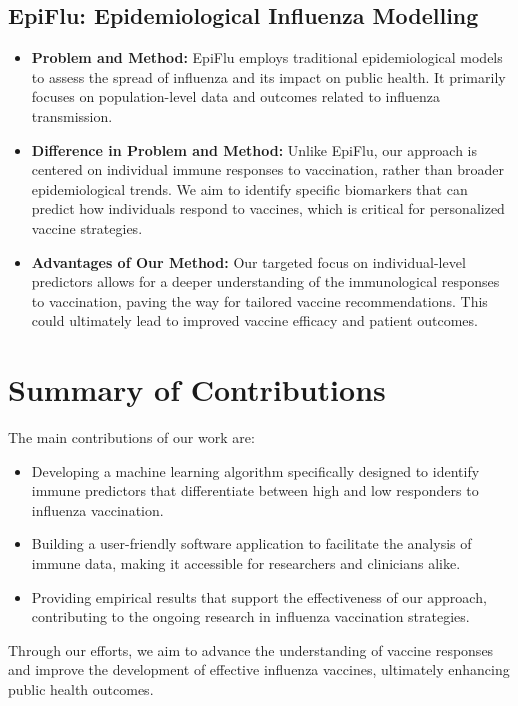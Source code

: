 \documentclass[runningheads,a4paper,11pt]{report}
\begin{document}
\subsection{EpiFlu: Epidemiological Influenza Modelling}
\begin{itemize}
    \item \textbf{Problem and Method:} EpiFlu employs traditional epidemiological models to assess the spread of influenza and its impact on public health. It primarily focuses on population-level data and outcomes related to influenza transmission.
    \item \textbf{Difference in Problem and Method:} Unlike EpiFlu, our approach is centered on individual immune responses to vaccination, rather than broader epidemiological trends. We aim to identify specific biomarkers that can predict how individuals respond to vaccines, which is critical for personalized vaccine strategies.
    \item \textbf{Advantages of Our Method:} Our targeted focus on individual-level predictors allows for a deeper understanding of the immunological responses to vaccination, paving the way for tailored vaccine recommendations. This could ultimately lead to improved vaccine efficacy and patient outcomes.
\end{itemize}

\section{Summary of Contributions}

The main contributions of our work are:
\begin{itemize}
    \item Developing a machine learning algorithm specifically designed to identify immune predictors that differentiate between high and low responders to influenza vaccination.
    \item Building a user-friendly software application to facilitate the analysis of immune data, making it accessible for researchers and clinicians alike.
    \item Providing empirical results that support the effectiveness of our approach, contributing to the ongoing research in influenza vaccination strategies.
\end{itemize}

Through our efforts, we aim to advance the understanding of vaccine responses and improve the development of effective influenza vaccines, ultimately enhancing public health outcomes.
\end{document}

